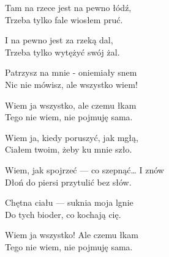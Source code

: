 \begin{text}
    Tam na rzece jest na pewno łódź,\\
    Trzeba tylko fale wiosłem pruć.

    I na pewno jest za rzeką dal,\\
    Trzeba tylko wytężyć swój żal.

    Patrzysz na mnie - oniemiały snem\\
    Nic nie mówisz, ale wszystko wiem!

    Wiem ja wszystko, ale czemu łkam\\
    Tego nie wiem, nie pojmuję sama.

    Wiem ja, kiedy poruszyć, jak mgłą,\\
    Ciałem twoim, żeby ku mnie szło.

    Wiem, jak spojrzeć — co szepnąć… I znów\\
    Dłoń do piersi przytulić bez słów.

    Chętna ciału — suknia moja lgnie\\
    Do tych bioder, co kochają cię.

    Wiem ja wszystko! Ale czemu łkam\\
    Tego nie wiem, nie pojmuję sama.
\end{text}
\begin{chord}

\end{chord}